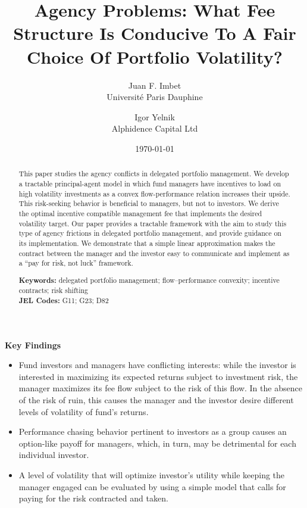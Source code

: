 \documentclass[11pt]{article}
\begin{document}
\begin{titlepage}
\title{\Large\bf Agency Problems: What Fee Structure Is Conducive To A Fair Choice Of Portfolio Volatility?}
\author{\normalsize Juan F. Imbet\\ \normalsize Université Paris Dauphine
\and
\normalsize Igor Yelnik\\ \normalsize Alphidence Capital Ltd}
\date{\today}

\maketitle

\begin{center}
\textbf{Key Findings}
\begin{itemize}
    \item Fund investors and managers have conflicting interests: while the investor is interested in maximizing its expected returns subject to investment risk, the manager maximizes its fee flow subject to the risk of this flow. In the absence of the risk of ruin, this causes the manager and the investor desire different levels of volatility of fund's returns.
\item Performance chasing behavior pertinent to investors as a group causes an option-like payoff for managers, which, in turn, may be detrimental for each individual investor.
\item A level of volatility that will optimize investor's utility while keeping the manager engaged can be evaluated by using a simple model that calls for paying for the risk contracted and taken.
\end{itemize}
\end{center}

\begin{abstract}
\noindent \small
This paper studies the agency conflicts in delegated portfolio management. We develop a tractable principal-agent model in which fund managers have incentives to load on high volatility investments as a convex flow-performance relation increases their upside. This risk-seeking behavior is beneficial to managers, but not to investors. We derive the optimal incentive compatible management fee that implements the desired volatility target. Our paper provides a tractable framework with the aim to study this type of agency frictions in delegated portfolio management, and provide guidance on its implementation. We demonstrate that a simple linear approximation makes the contract between the manager and the investor easy to communicate and implement as a “pay for risk, not luck” framework.
\vspace{1cm}

\noindent\textbf{Keywords:} delegated portfolio management; flow–performance convexity; incentive contracts; risk shifting \\
\vspace{0in}
\noindent\textbf{JEL Codes:} G11; G23; D82

\bigskip
\end{abstract}

\setcounter{page}{0}
\thispagestyle{empty}
\end{titlepage}
\end{document}
